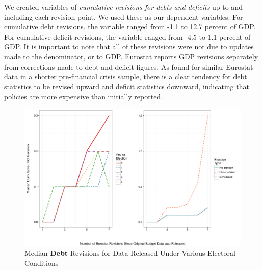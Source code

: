 \documentclass[]{article}
\begin{document}
We created variables of \emph{cumulative revisions for debts and deficits} up to and including each revision point. We used these as our dependent variables. For cumulative debt revisions, the variable ranged from -1.1 to 12.7 percent of GDP. For cumulative deficit revisions, the variable ranged from -4.5 to 1.1 percent of GDP. It is important to note that all of these revisions were not due to updates made to the denominator, or to GDP. Eurostat reports GDP revisions separately from corrections made to debt and deficit figures. As \cite{DeCastro2013} found for similar Eurostat data in a shorter pre-financial crisis sample, there is a clear tendency for debt statistics to be revised upward and deficit statistics downward, indicating that policies are more expensive than initially reported.

\begin{figure}
    \begin{center}
        \caption{Median \textbf{Debt} Revisions for Data Released Under Various Electoral Conditions}
        \label{median_debt_revisions}
        \includegraphics[scale=0.6]{figures/median_debt_revisions.pdf}
    \end{center}
\end{figure}
\end{document}
